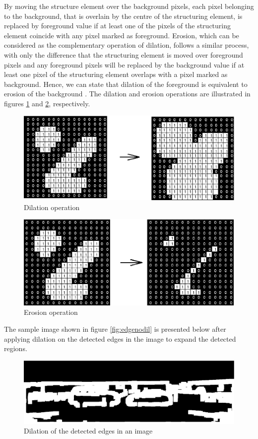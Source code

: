 By moving the structure element over the background pixels, each pixel belonging to the background, that 
is overlain by the centre of the structuring element, is replaced by foreground value if at least one of the pixels of the structuring element coincide with any pixel marked as foreground.
Erosion, which can be considered as the complementary operation of dilation, follows a similar process, with only the difference that the 
structuring element is moved over foreground pixels and any
foreground pixels will be replaced by the background value if at least one pixel of the structuring element overlaps with a pixel marked as background.
Hence, we can state that dilation of the foreground is equivalent to erosion of the background \cite{ritt00}.
The dilation and erosion operations are illustrated in figures \ref{fig:dilate} and \ref{fig:erode}, respectively.

\begin{figure}[H]
\centering
\includegraphics[scale=0.8]{diltbin}
\caption{Dilation operation \cite{HIPRdil}}
\label{fig:dilate}
\end{figure} 

\begin{figure}[H]
\centering
\includegraphics[scale=0.8]{erodbin}
\caption{Erosion operation \cite{HIPRerod}}
\label{fig:erode}
\end{figure} 

The sample image shown in figure \ref{fig:edgenodil} is presented below after applying dilation on the detected edges in the image to expand the 
detected regions.

\begin{figure}[H]
\centering
\includegraphics[scale=0.35]{mask5dil}
\caption{Dilation of the detected edges in an image}
\label{fig:edgedil}
\end{figure} 


